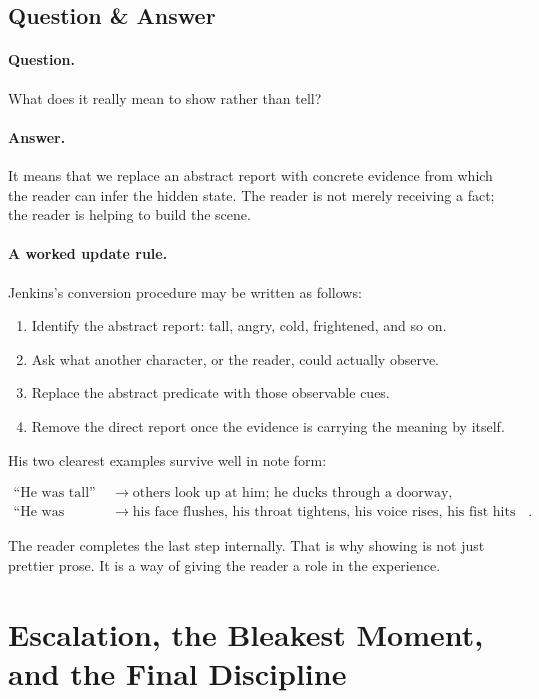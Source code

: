 \subsection{Question \& Answer}

\paragraph{Question.} What does it really mean to show rather than tell?

\paragraph{Answer.} It means that we replace an abstract report with concrete evidence from which the reader can infer the hidden state. The reader is not merely receiving a fact; the reader is helping to build the scene.

\paragraph{A worked update rule.} Jenkins's conversion procedure may be written as follows:

\begin{enumerate}
\item Identify the abstract report: tall, angry, cold, frightened, and so on.
\item Ask what another character, or the reader, could actually observe.
\item Replace the abstract predicate with those observable cues.
\item Remove the direct report once the evidence is carrying the meaning by itself.
\end{enumerate}

His two clearest examples survive well in note form:

\begin{align}
\text{``He was tall''} &\to \text{others look up at him; he ducks through a doorway},\\
\text{``He was angry''} &\to \text{his face flushes, his throat tightens, his voice rises, his fist hits the table}.
\end{align}

The reader completes the last step internally. That is why showing is not just prettier prose. It is a way of giving the reader a role in the experience.

\section{Escalation, the Bleakest Moment, and the Final Discipline}

